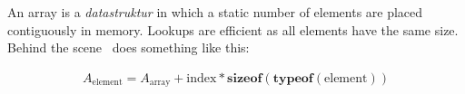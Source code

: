 An array is a \textsl{datastruktur} in which a static number of elements are placed contiguously in memory. Lookups are efficient as all elements have the same size. Behind the scene \csharp\ does something like this:

\begin{eqnarray}
  A_{\mathrm{element}} = A_{\mathrm{array}} + \mathrm{index}*\mathbf{sizeof}(\mathbf{typeof}(\mathrm{element}))
\end{eqnarray}
